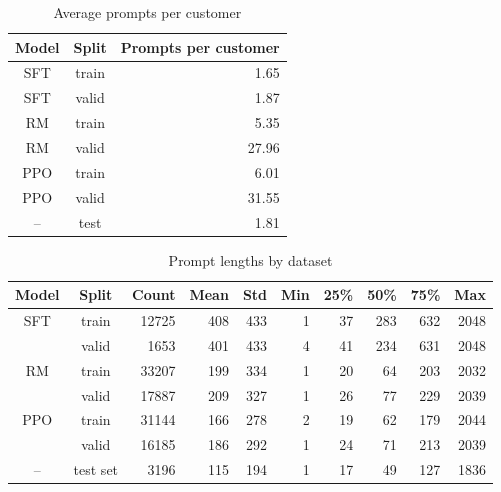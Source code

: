\begin{table}[hp]
    \centering
    \caption{Average prompts per customer}
    \label{tab:prompts-per-cust}
    \begin{tabular}{ccr}
    \toprule
    Model & Split &  Prompts per customer \\
    \midrule
           SFT & train &                  1.65 \\
           SFT & valid &                  1.87 \\
            RM & train &                  5.35 \\
            RM & valid &                 27.96 \\
           PPO & train &                  6.01 \\
           PPO & valid &                 31.55 \\
            -- & test  &                  1.81 \\
    \bottomrule
    \end{tabular}
\end{table}

\begin{table}[tp]
    \centering
    \caption{Prompt lengths by dataset}
    \label{tab:prompt-length-by-model}
    \begin{tabular}{ccrrrrrrrr}
    \toprule
    Model    &  Split     &            Count & Mean &  Std & Min & 25\% &  50\% &  75\% &   Max \\
    \midrule
    SFT & train &            12725 &  408 &  433 &   1 &  37 &  283 &  632 &  2048 \\
        & valid &             1653 &  401 &  433 &   4 &  41 &  234 &  631 &  2048 \\
    RM & train &            33207 &  199 &  334 &   1 &  20 &   64 &  203 &  2032 \\
        & valid &            17887 &  209 &  327 &   1 &  26 &   77 &  229 &  2039 \\
    PPO & train &            31144 &  166 &  278 &   2 &  19 &   62 &  179 &  2044 \\
        & valid &            16185 &  186 &  292 &   1 &  24 &   71 &  213 &  2039 \\
    -- & test set &             3196 &  115 &  194 &   1 &  17 &   49 &  127 &  1836 \\
    \bottomrule
    \end{tabular}
\end{table}

